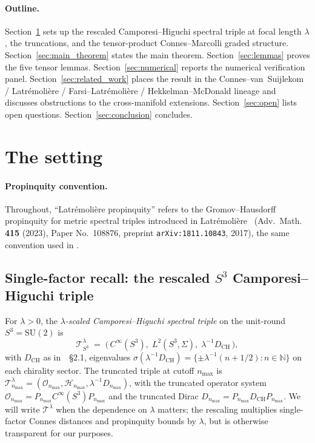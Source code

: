 \documentclass[11pt,a4paper]{article}
\theoremstyle{plain}
\theoremstyle{definition}
\newcommand{\nmax}{n_{\max}}
\newcommand{\sthree}{S^{3}}
\newcommand{\Hilb}{\mathcal{H}}
\newcommand{\Op}{\mathcal{O}}
\newcommand{\Tcal}{\mathcal{T}}
\newcommand{\N}{\mathbb{N}}
\newcommand{\SU}{\mathrm{SU}}
\newcommand{\DCH}{D_{\mathrm{CH}}}
\begin{document}
\paragraph{Outline.}
Section~\ref{sec:setup} sets up the rescaled Camporesi--Higuchi
spectral triple at focal length $\lambda$, the truncations, and the
tensor-product Connes--Marcolli graded structure.
Section~\ref{sec:main_theorem} states the main theorem.
Section~\ref{sec:lemmas} proves the five tensor lemmas.
Section~\ref{sec:numerical} reports the numerical verification panel.
Section~\ref{sec:related_work} places the result in the
Connes--van~Suijlekom / Latr\'emoli\`ere / Farsi--Latr\'emoli\`ere /
Hekkelman--McDonald lineage and discusses obstructions to the
cross-manifold extensions.
Section~\ref{sec:open} lists open questions.
Section~\ref{sec:conclusion} concludes.

\section{The setting}\label{sec:setup}

\paragraph{Propinquity convention.}
Throughout, ``Latr\'emoli\`ere propinquity'' refers to the
Gromov--Hausdorff propinquity for metric spectral triples introduced in
Latr\'emoli\`ere~\cite{latremoliere_metric_st_2017} (Adv.~Math.
\textbf{415} (2023), Paper No.~108876, preprint
\texttt{arXiv:1811.10843}, 2017), the same convention used in
\cite{loutey_paper38}.

\subsection{Single-factor recall: the rescaled $\sthree$ Camporesi--Higuchi triple}
\label{sec:single_factor_recall}

For $\lambda > 0$, the \emph{$\lambda$-scaled Camporesi--Higuchi
spectral triple} on the unit-round $\sthree = \SU(2)$ is
\begin{equation}\label{eq:single_factor_triple}
   \Tcal_{\sthree}^{\lambda}
   \;=\; \bigl(\, C^\infty(\sthree),\; L^2(\sthree, \Sigma),\;
   \lambda^{-1}\DCH \,\bigr),
\end{equation}
with $\DCH$ as in~\cite{loutey_paper38}~\S 2.1, eigenvalues
$\sigma(\lambda^{-1}\DCH) = \{\pm \lambda^{-1}(n + 1/2) : n \in \N\}$ on
each chirality sector. The truncated triple at cutoff $\nmax$ is
$\Tcal_{\nmax}^{\lambda} = (\Op_{\nmax}, \Hilb_{\nmax},
\lambda^{-1} D_{\nmax})$, with the truncated operator system
$\Op_{\nmax} = P_{\nmax} C^\infty(\sthree) P_{\nmax}$ and the truncated
Dirac $D_{\nmax} = P_{\nmax} \DCH P_{\nmax}$. We will write
$\Tcal^\lambda$ when the dependence on $\lambda$ matters; the rescaling
multiplies single-factor Connes distances and propinquity bounds by
$\lambda$, but is otherwise transparent for our purposes.
\end{document}

